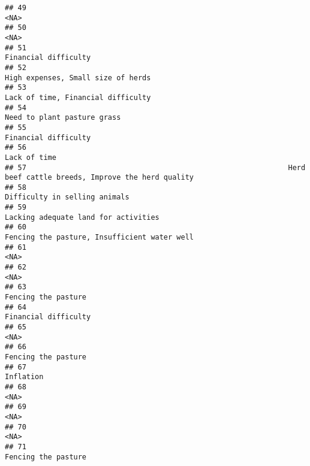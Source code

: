 \documentclass[
]{article}
\begin{document}
\begin{verbatim}
## 49                                                                                                          <NA>
## 50                                                                                                          <NA>
## 51                                                                                          Financial difficulty
## 52                                                                            High expenses, Small size of herds
## 53                                                                            Lack of time, Financial difficulty
## 54                                                                                   Need to plant pasture grass
## 55                                                                                          Financial difficulty
## 56                                                                                                  Lack of time
## 57                                                             Herd beef cattle breeds, Improve the herd quality
## 58                                                                                 Difficulty in selling animals
## 59                                                                          Lacking adequate land for activities
## 60                                                                  Fencing the pasture, Insufficient water well
## 61                                                                                                          <NA>
## 62                                                                                                          <NA>
## 63                                                                                           Fencing the pasture
## 64                                                                                          Financial difficulty
## 65                                                                                                          <NA>
## 66                                                                                           Fencing the pasture
## 67                                                                                                     Inflation
## 68                                                                                                          <NA>
## 69                                                                                                          <NA>
## 70                                                                                                          <NA>
## 71                                                                                           Fencing the pasture

\end{verbatim}
\end{document}
